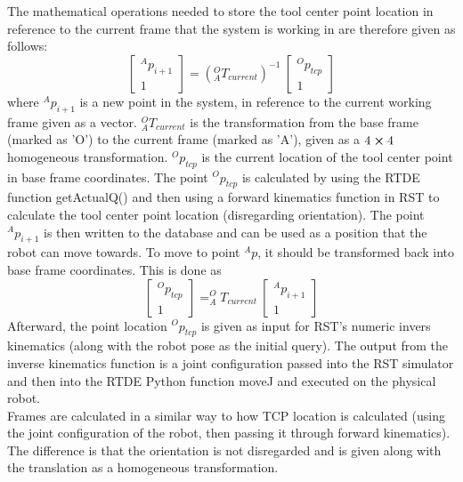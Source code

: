 The mathematical operations needed to store the tool center point location in reference to the current frame that the system is working in are therefore given as follows:
$$
\begin{bmatrix}
    ^{A}p_{i + 1}   \\
    1     
\end{bmatrix}
= (_{A}^{O}T_{current})^{-1} \ 
\begin{bmatrix}
    ^{O}p_{tcp}   \\
    1     
\end{bmatrix}
$$
where $^{A}p_{i + 1}$ is a new point in the system, in reference to the current working frame given as a vector. $_{A}^{O}T_{current}$ is the transformation from the base frame (marked as 'O') to the current frame (marked as 'A'), given as a $4\cross 4$ homogeneous transformation. $^{O}p_{tcp}$ is the current location of the tool center point in base frame coordinates. The point $^{O}p_{tcp}$ is calculated by using the RTDE function getActualQ() and then using a forward kinematics function in RST to calculate the tool center point location (disregarding orientation). The point $^{A}p_{i + 1}$ is then written to the database and can be used as a position that the robot can move towards.
To move to point $^{A}p$, it should be transformed back into base frame coordinates. This is done as
$$
\begin{bmatrix}
    ^{O}p_{tcp}   \\
    1     
\end{bmatrix}
=
_{A}^{O}T_{current} \ 
\begin{bmatrix}
    ^{A}p_{i + 1}   \\
    1     
\end{bmatrix}
$$
Afterward, the point location $^{O}p_{tcp}$ is given as input for RST's numeric invers kinematics (along with the robot pose as the initial query). The output from the inverse kinematics function is a joint configuration passed into the RST simulator and then into the RTDE Python function moveJ and executed on the physical robot.
\\
Frames are calculated in a similar way to how TCP location is calculated (using the joint configuration of the robot, then passing it through forward kinematics). The difference is that the orientation is not disregarded and is given along with the translation as a homogeneous transformation.
